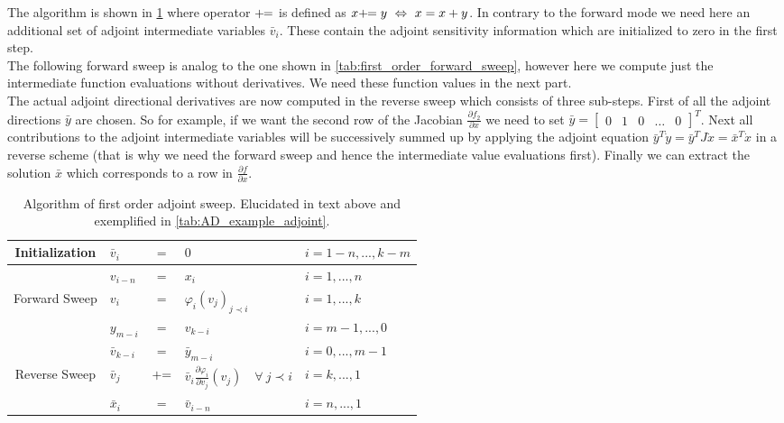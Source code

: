 \documentclass{scrartcl}[12pt, halfparskip]
\numberwithin{equation}{section}
\numberwithin{figure}{section}
\numberwithin{table}{section}
\begin{document}
The algorithm is shown in \cref{tab:first_order_adjoint_sweep} where operator $+ \hspace{-0.12cm} =$ is defined as $x + \hspace{-0.12cm} = y \ \Leftrightarrow \ x = x + y$. In contrary to the forward mode we need here an additional set of adjoint intermediate variables $\bar{v}_i$. These contain the adjoint sensitivity information which are initialized to zero in the first step. \\
The following forward sweep is analog to the one shown in \cref{tab:first_order_forward_sweep}, however here we compute just the intermediate function evaluations without derivatives. We need these function values in the next part. \\
The actual adjoint directional derivatives are now computed in the reverse sweep which consists of three sub-steps. First of all the adjoint directions $\bar{y}$ are chosen. So for example, if we want the second row of the Jacobian $\frac{\partial f_2}{\partial x}$ we need to set $\bar{y} = \begin{bmatrix}
0 & 1 & 0 & \dots & 0
\end{bmatrix}^T$.
Next all contributions to the adjoint intermediate variables will be successively summed up by applying the adjoint equation $\bar{y}^T \dot{y} = \bar{y}^T J \dot{x} = \bar{x}^T \dot{x}$ in a reverse scheme (that is why we need the forward sweep and hence the intermediate value evaluations first). Finally we can extract the solution $\bar{x}$ which corresponds to a row in $\frac{\partial f}{\partial x}$.


\begin{table}[H]
	\centering
	\begin{tabular}{| c | l c l | l |} \hline
		Initialization & $\bar{v}_i$ & $=$ & $0$ & $i=1-n,...,k-m$ \\ \hline
		& $v_{i-n}$ & $=$ & $x_i$ & $i=1,...,n$ \\
		Forward Sweep & $v_{i}$ & $=$ & $\varphi_i(v_j)_{j \prec i}$ & $i=1,...,k$ \\
		& $y_{m-i}$ & $=$ & $v_{k-i}$ & $i=m-1,...,0$ \\ \hline
		& $\bar{v}_{k-i}$ & $=$ & $\bar{y}_{m-i}$ & $i=0,...,m-1$ \\
		Reverse Sweep & $\bar{v}_j$ & $+ \hspace{-0.1cm} =$ & $\bar{v}_i \frac{\partial \varphi_i}{\partial v_j}(v_j) \quad \forall \ j \prec i$ & $i=k,...,1$ \\
		& $\bar{x}_i$ & $=$ & $\bar{v}_{i-n}$ & $i=n,...,1$ \\ \hline
	\end{tabular}
	\caption{Algorithm of first order adjoint sweep. Elucidated in text above and exemplified in \cref{tab:AD_example_adjoint}.}
	\label{tab:first_order_adjoint_sweep}
\end{table}
\end{document}
